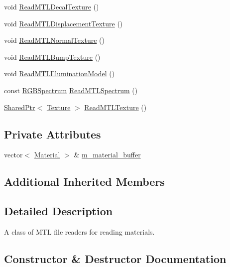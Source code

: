 \begin{DoxyCompactItemize}
void \hyperlink{classmage_1_1_m_t_l_reader_a578df3a55c79fba9d46616791b2e5539}{Read\+M\+T\+L\+Decal\+Texture} ()
\item 
void \hyperlink{classmage_1_1_m_t_l_reader_a9d4f8dea5a5582c5e7b788149110800c}{Read\+M\+T\+L\+Displacement\+Texture} ()
\item 
void \hyperlink{classmage_1_1_m_t_l_reader_ae44a5704a09edb722f99a480a58c807a}{Read\+M\+T\+L\+Normal\+Texture} ()
\item 
void \hyperlink{classmage_1_1_m_t_l_reader_acf7aacf933f842d3e14af92d161acd5b}{Read\+M\+T\+L\+Bump\+Texture} ()
\item 
void \hyperlink{classmage_1_1_m_t_l_reader_a77bbb659fe66e9bad451281dbd0c49d7}{Read\+M\+T\+L\+Illumination\+Model} ()
\item 
const \hyperlink{structmage_1_1_r_g_b_spectrum}{R\+G\+B\+Spectrum} \hyperlink{classmage_1_1_m_t_l_reader_a607a55ab2e68d3bc9b879d7e3377f0e3}{Read\+M\+T\+L\+Spectrum} ()
\item 
\hyperlink{namespacemage_a1e01ae66713838a7a67d30e44c67703e}{Shared\+Ptr}$<$ \hyperlink{classmage_1_1_texture}{Texture} $>$ \hyperlink{classmage_1_1_m_t_l_reader_a7ff401dab1b58709debff6cbe2c02d0c}{Read\+M\+T\+L\+Texture} ()
\end{DoxyCompactItemize}
\subsection*{Private Attributes}
\begin{DoxyCompactItemize}
\item 
vector$<$ \hyperlink{structmage_1_1_material}{Material} $>$ \& \hyperlink{classmage_1_1_m_t_l_reader_a6382e0e9fce6581b129d18f5d82994c2}{m\+\_\+material\+\_\+buffer}
\end{DoxyCompactItemize}
\subsection*{Additional Inherited Members}


\subsection{Detailed Description}
A class of M\+TL file readers for reading materials. 

\subsection{Constructor \& Destructor Documentation}
\hypertarget{classmage_1_1_m_t_l_reader_a924f813cca170e2592a6e7d2a3255be8}{}\label{classmage_1_1_m_t_l_reader_a924f813cca170e2592a6e7d2a3255be8} 
